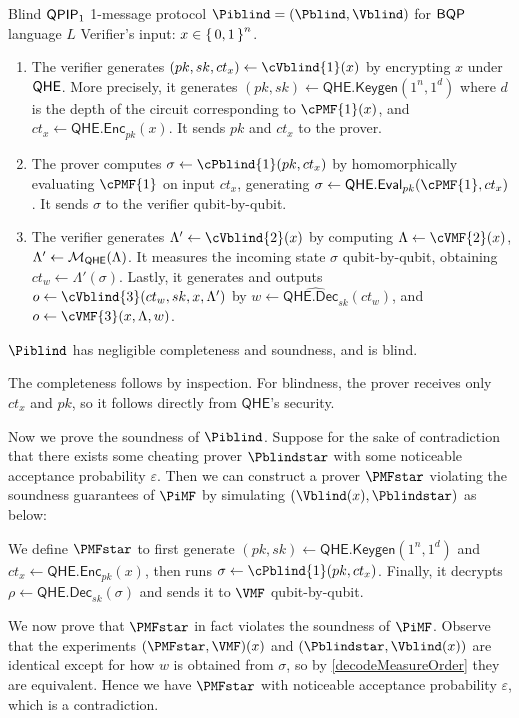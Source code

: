 \begin{protocol}{Blind $\operatorname{\mathsf{QPIP}}_1$ 1-message protocol $\Piblind = (\Pblind, \Vblind)$ for $\operatorname{\mathsf{BQP}}$ language $L$}
	\label{proto:BlindBQP}
	Verifier's input: $x\in\set{0,1}^n$.
	
	\begin{enumerate}
		\item The verifier generates $(pk, sk, ct_x)\leftarrow\cVblind{1}(x)$ by encrypting $x$ under $\mathsf{QHE}$.
			More precisely, it generates
			$(pk, sk)\leftarrow\mathsf{QHE.Keygen}(1^n, 1^d)$ where $d$ is the depth of the circuit corresponding to $\cPMF{1}(x)$, and
			$ct_x\leftarrow\mathsf{QHE.Enc}_{pk}(x)$.
			It sends $pk$ and $ct_x$ to the prover.
		\item The prover computes $\sigma\leftarrow\cPblind{1}(pk, ct_x)$ by homomorphically evaluating $\cPMF{1}$ on input $ct_x$, generating $\sigma\leftarrow\QEval_{pk}(\cPMF{1}, ct_x)$.
			It sends $\sigma$ to the verifier qubit-by-qubit.
		\item The verifier generates $\Lambda'\leftarrow\cVblind{2}(x)$ by computing
			$\Lambda\leftarrow\cVMF{2}(x)$,
			$\Lambda'\leftarrow{\cal M}_{\mathsf{QHE}}(\Lambda)$.
			It measures the incoming state $\sigma$ qubit-by-qubit, obtaining $ct_w\leftarrow\Lambda'(\sigma)$.
			Lastly, it generates and outputs $o\leftarrow\cVblind{3}(ct_w, sk, x, \Lambda')$ by
			$w\leftarrow\widehat{\mathsf{QHE.Dec}_{sk}}(ct_w)$,
			and $o\leftarrow\cVMF{3}(x, \Lambda, w)$.
	\end{enumerate}
\end{protocol}

\begin{thm}
	\label{thm:BlindBQP}
	$\Piblind$ has negligible completeness and soundness, and is blind.
\end{thm}
\begin{prf}
	The completeness follows by inspection.
	For blindness, the prover receives only $ct_x$ and $pk$, so it follows directly from $\mathsf{QHE}$'s security.
	
	Now we prove the soundness of $\Piblind$.
	Suppose for the sake of contradiction that there exists some cheating prover $\Pblindstar$ with some noticeable acceptance probability $\varepsilon$.
	Then we can construct a prover $\PMFstar$ violating the soundness guarantees of $\PiMF$ by simulating $(\Vblind(x), \Pblindstar)$ as below:

	We define $\PMFstar$ to first generate
	$(pk, sk)\leftarrow\mathsf{QHE.Keygen}(1^n, 1^d)$
	and
	$ct_x\leftarrow\mathsf{QHE.Enc}_{pk}(x)$,
	then runs $\sigma\leftarrow\cPblind{1}(pk, ct_x)$.
	Finally, it decrypts
	$\rho\leftarrow\mathsf{QHE.Dec}_{sk}(\sigma)$
	and sends it to $\VMF$ qubit-by-qubit.

	We now prove that $\PMFstar$ in fact violates the soundness of $\PiMF$.
	Observe that the experiments $(\PMFstar, \VMF)(x)$ and $(\Pblindstar, \Vblind(x))$ are identical except for how $w$ is obtained from $\sigma$,
	so by \cref{decodeMeasureOrder} they are equivalent.
	Hence we have $\PMFstar$ with noticeable acceptance probability $\varepsilon$, which is a contradiction. 
\end{prf}

